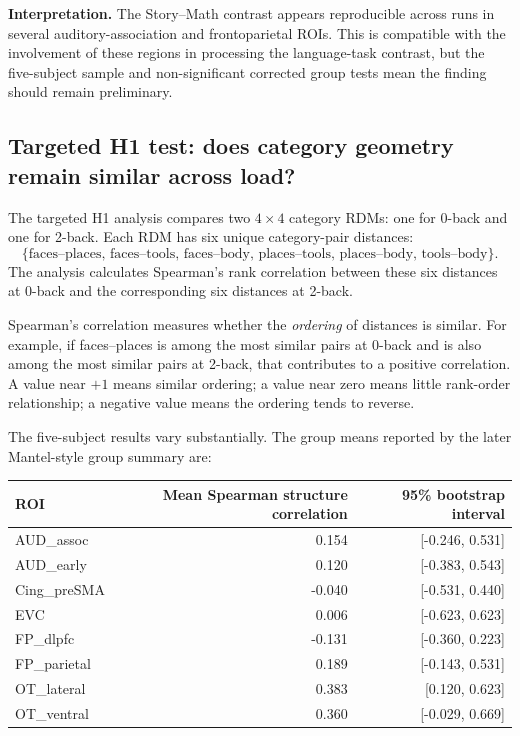 \documentclass[11pt,a4paper]{article}
\begin{document}
\textbf{Interpretation.} The Story--Math contrast appears reproducible across runs in several auditory-association and frontoparietal ROIs. This is compatible with the involvement of these regions in processing the language-task contrast, but the five-subject sample and non-significant corrected group tests mean the finding should remain preliminary.

\subsection{Targeted H1 test: does category geometry remain similar across load?}

The targeted H1 analysis compares two \(4\times4\) category RDMs: one for 0-back and one for 2-back. Each RDM has six unique category-pair distances:
\[
\{\text{faces--places, faces--tools, faces--body,}
\text{ places--tools, places--body, tools--body}\}.
\]
The analysis calculates Spearman's rank correlation between these six distances at 0-back and the corresponding six distances at 2-back.

Spearman's correlation measures whether the \emph{ordering} of distances is similar. For example, if faces--places is among the most similar pairs at 0-back and is also among the most similar pairs at 2-back, that contributes to a positive correlation. A value near \(+1\) means similar ordering; a value near zero means little rank-order relationship; a negative value means the ordering tends to reverse.

The five-subject results vary substantially. The group means reported by the later Mantel-style group summary are:

\begin{center}
\begin{tabular}{lrr}
\toprule
\textbf{ROI} & \textbf{Mean Spearman structure correlation} & \textbf{95\% bootstrap interval}\\
\midrule
AUD\_assoc & 0.154 & [-0.246, 0.531]\\
AUD\_early & 0.120 & [-0.383, 0.543]\\
Cing\_preSMA & -0.040 & [-0.531, 0.440]\\
EVC & 0.006 & [-0.623, 0.623]\\
FP\_dlpfc & -0.131 & [-0.360, 0.223]\\
FP\_parietal & 0.189 & [-0.143, 0.531]\\
OT\_lateral & 0.383 & [0.120, 0.623]\\
OT\_ventral & 0.360 & [-0.029, 0.669]\\
\bottomrule
\end{tabular}
\end{center}
\end{document}
